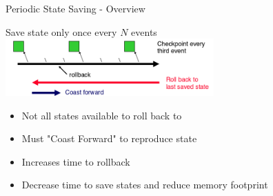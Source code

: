 \documentclass[10pt]{beamer}
\begin{document}
\begin{frame}{Periodic State Saving - Overview}
    \begin{block}{Save state only once every $N$ events}
        \bigskip
        \centering
        \includegraphics[width=0.6\textwidth]{../figs/pss.png}
        \bigskip
        \begin{itemize}
            \item Not all states available to roll back to
            \item Must "Coast Forward" to reproduce state
            \item Increases time to rollback
            \item Decrease time to save states and reduce memory footprint
        \end{itemize}
    \end{block}
\end{frame}
\end{document}

